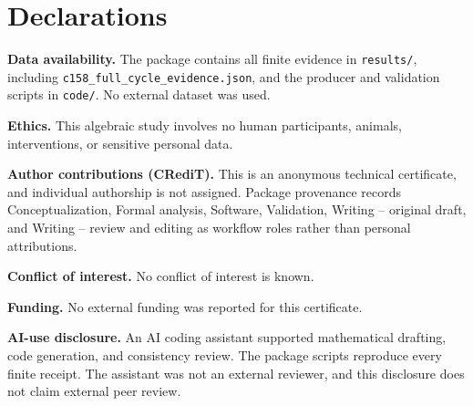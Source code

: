 \documentclass[10pt]{article}
\begin{document}
\section*{Declarations}
\textbf{Data availability.}  The package contains all finite evidence in
\texttt{results/}, including
\texttt{c158\_full\_cycle\_evidence.json}, and the producer and validation
scripts in \texttt{code/}.  No external dataset was used.

\textbf{Ethics.}  This algebraic study involves no human participants,
animals, interventions, or sensitive personal data.

\textbf{Author contributions (CRediT).}  This is an anonymous technical
certificate, and individual authorship is not assigned.  Package provenance
records Conceptualization, Formal analysis, Software, Validation, Writing --
original draft, and Writing -- review and editing as workflow roles rather
than personal attributions.

\textbf{Conflict of interest.}  No conflict of interest is known.

\textbf{Funding.}  No external funding was reported for this certificate.

\textbf{AI-use disclosure.}  An AI coding assistant supported mathematical
drafting, code generation, and consistency review.  The package scripts
reproduce every finite receipt.  The assistant was not an external reviewer,
and this disclosure does not claim external peer review.
\end{document}
